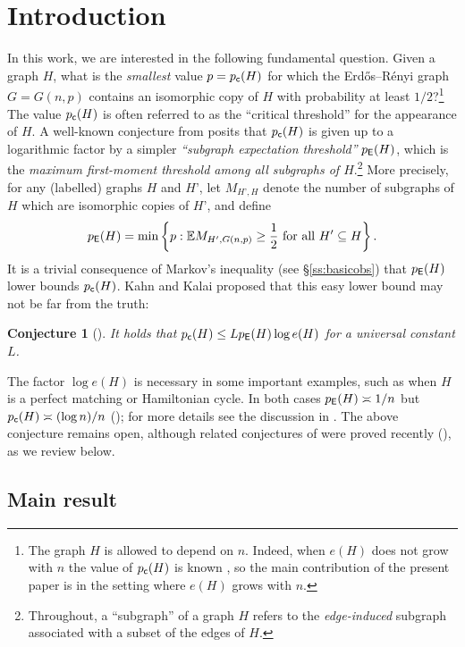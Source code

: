 \documentclass[11pt,reqno]{amsart}
\theoremstyle{plain}
\newtheorem*{conjecture*}{Conjecture}
\theoremstyle{definition}
\theoremstyle{remark}
\newcommand{\E}{\mathbb{E}}
\newcommand{\beq}{\begin{equation}}
\newcommand{\eeq}{\end{equation}}
\begin{document}
\section{Introduction}

In this work, we are interested in the following fundamental question. 
Given a graph $H$, what is the \textit{smallest} value $p=p_\mathsf{c}(H)$ for which the Erd\H{o}s--R\'enyi graph $G=G(n,p)$ contains an isomorphic copy of $H$ with probability at least $1/2$?\footnote{The graph $H$ is allowed to depend on $n$. Indeed, when $e(H)$ does not grow with $n$ 
the value of $p_\mathsf{c}(H)$ is known \cite{MR125031, bela_fixed}, so the main contribution of the present paper is in the setting where $e(H)$ grows with $n$.} The value 
$p_\mathsf{c}(H)$ is often referred to as the ``critical threshold'' for the appearance of $H$. 
A well-known conjecture from \cite{kahn2007thresholds} posits that $p_\mathsf{c}(H)$ 
is given up to a logarithmic factor by a simpler \emph{``subgraph expectation threshold''} $p_\mathsf{E}(H)$, which is the \textit{maximum first-moment threshold among all subgraphs of $H$}.\footnote{Throughout, a ``subgraph'' of a graph $H$ refers to the \textit{edge-induced} subgraph associated with a subset of the edges of $H$.} More precisely, for any (labelled) graphs $H$ and $H’$, let $M_{H’,H}$ denote the number of subgraphs of $H$ which are isomorphic copies of $H’$, and define
	\beq\label{e:pE}
	\pE(H)
	=\min\bigg\{ p : \E M_{H',G(n,p)} \ge \frac12
	\textup{ for all } H' \subseteq H\bigg\}\,.
	\eeq
It is a trivial consequence of Markov's inequality {(see \S\ref{ss:basicobs})} that
$p_\mathsf{E}(H)$ lower bounds $p_\mathsf{c}(H)$. Kahn and Kalai proposed that this easy lower bound may not be far from the truth:

\begin{conjecture*}[{\cite[Conjecture~2]{kahn2007thresholds}}]
It holds that $p_\mathsf{c}(H) \le L p_\mathsf{E}(H) \log e(H)$ for a universal constant $L$.
\end{conjecture*} 


The factor $\log e(H)$ is necessary in some important examples, such as when $H$ is a perfect matching or Hamiltonian cycle. In both cases $p_\mathsf{E}(H) \asymp 1/n$ but $p_\mathsf{c}(H)\asymp (\log n)/n$ (\cite{MR125031,erdHos1966existence, MR389666,MR0434878}); for more details see the discussion in \cite{kahn2007thresholds}. The above conjecture remains open, although related conjectures of \cite{kahn2007thresholds,MR2743011} were proved recently (\cite{fracKK_annals,park2022proof}), {as we review below.}

\subsection{Main result}
\end{document}
